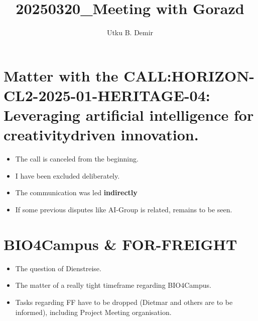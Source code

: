 
\title{20250320\_Meeting with Gorazd}
\author{Utku B. Demir}


\maketitle

\section{Matter with the CALL:HORIZON-CL2-2025-01-HERITAGE-04: Leveraging artificial intelligence for creativitydriven innovation. }

\begin{itemize}
	\item The call is canceled from the beginning.
	\item I have been excluded deliberately.
	\item The communication was led \textbf{indirectly}
	\item If some previous disputes like AI-Group is related, remains to be seen.
\end{itemize}

\section{BIO4Campus \& FOR-FREIGHT}

\begin{itemize}
	\item The question of Dienstreise.
	\item The matter of a really tight timeframe regarding BIO4Campus.
	\item Tasks regarding FF have to be dropped (Dietmar and others are to be
	      informed), including Project Meeting organisation.
\end{itemize}


